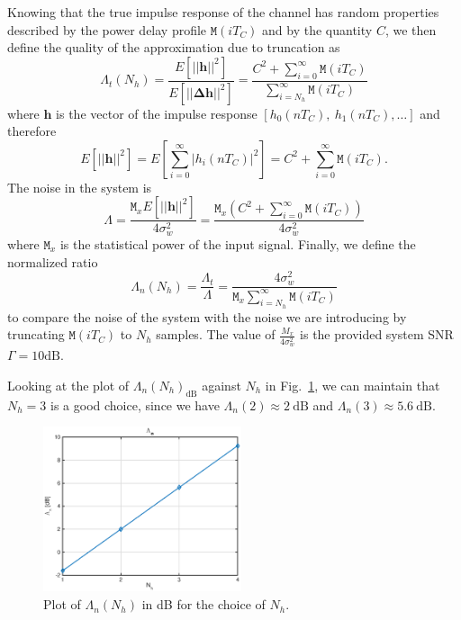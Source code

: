 \documentclass[10pt]{article}
\newcommand{\M} {\mathtt{M}}
\newcommand{\dB} {\mathrm{dB}}
\begin{document}
Knowing that the true impulse response of the channel has random properties described by the power delay profile $\M(iT_C)$ and by the quantity $C$, we then define the quality of the approximation due to truncation as
\begin{equation}
\Lambda_t(N_h) = \frac{E[||\mathbf{h}||^2]}{E[||\mathbf{\Delta h}||^2]} = \frac{C^2 + \sum_{i=0}^{\infty} \M(iT_C)}{\sum_{i=N_h}^{\infty} \M(iT_C)}
\end{equation}
where $\mathbf{h}$ is the vector of the impulse response $[h_0(nT_C),~h_1(nT_C),\ldots]$ and therefore
\begin{equation}
E[||\mathbf{h}||^2] = E[\sum_{i=0}^{\infty} |h_i(nT_C)|^2] = C^2 + \sum_{i=0}^{\infty} \M(iT_C).
\end{equation}
The noise in the system is
\begin{equation}
\Lambda = \frac{\M_x E[||\mathbf{h}||^2]}{4 \sigma_w^2} = \frac{\M_x (C^2 + \sum_{i=0}^{\infty} \M(iT_C))}{4 \sigma_w^2}
\end{equation}
where $\M_x$ is the statistical power of the input signal. Finally, we define the normalized ratio
\begin{equation}
\Lambda_n (N_h) = \frac{\Lambda_t}{\Lambda} = \frac{4 \sigma_w^2}{\M_x \sum_{i=N_h}^{\infty} \M(iT_C)}
\end{equation}
to compare the noise of the system with the noise we are introducing by truncating $\M(iT_C)$ to $N_h$ samples. The value of $\frac{M_x}{4\sigma_w^2}$ is the provided system SNR $\Gamma = 10 \dB$.

Looking at the plot of $\Lambda_n (N_h)_{\dB}$ against $N_h$ in Fig.~\ref{fig:p01_lambda_n}, we can maintain that $N_h = 3$ is a good choice, since we have $\Lambda_n(2) \approx 2~\dB$ and $\Lambda_n(3) \approx 5.6~\dB$.

\begin{figure}[ht]
	\centering
	\includegraphics[width=0.52\textwidth]{p01_lambda_n}
	\caption{Plot of $\Lambda_n (N_h)$ in dB for the choice of $N_h$.}
    \label{fig:p01_lambda_n}
\end{figure}
\end{document}
